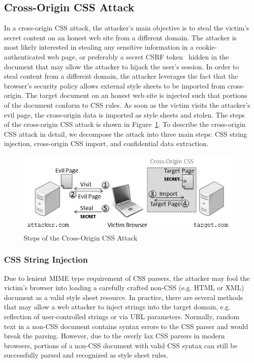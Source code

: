 \documentclass{acm_proc_article-sp}
\begin{document}
\subsection{Cross-Origin CSS Attack}
In a cross-origin CSS attack, the attacker's main objective is to steal the victim's secret content on an honest web site from a different domain. The attacker is most likely interested in stealing any sensitive information in a cookie-authenticated web page, or preferably a secret CSRF token~\cite{csrf} hidden in the document that may allow the attacker to hijack the user's session. In order to steal content from a different domain, the attacker leverages the fact that the browser's security policy allows external style sheets to be imported from cross-origin. The target document on an honest web site is injected such that portions of the document conform to CSS rules. As soon as the victim visits the attacker's evil page, the cross-origin data is imported as style sheets and stolen. The steps of the cross-origin CSS attack is shown in Figure~\ref{figure:scenario}. To describe the cross-origin CSS attack in detail, we decompose the attack into three main steps: CSS string injection, cross-origin CSS import, and confidential data extraction.

\begin{figure}
\centering
\includegraphics[width=\linewidth]{scenario.jpg}
\caption{Steps of the Cross-Origin CSS Attack}
\label{figure:scenario}
\end{figure}

\subsubsection{CSS String Injection}
Due to lenient MIME type requirement of CSS parsers, the attacker may fool the victim's browser into loading a carefully crafted non-CSS (e.g. HTML or XML) document as a valid style sheet resource. In practice, there are several methods that may allow a web attacker to inject strings into the target domain, e.g. reflection of user-controlled strings or via URL parameters. Normally, random text in a non-CSS document contains syntax errors to the CSS parser and would break the parsing. However, due to the overly lax CSS parsers in modern browsers, portions of a non-CSS document with valid CSS syntax can still be successfully parsed and recognized as style sheet rules.
\end{document}
